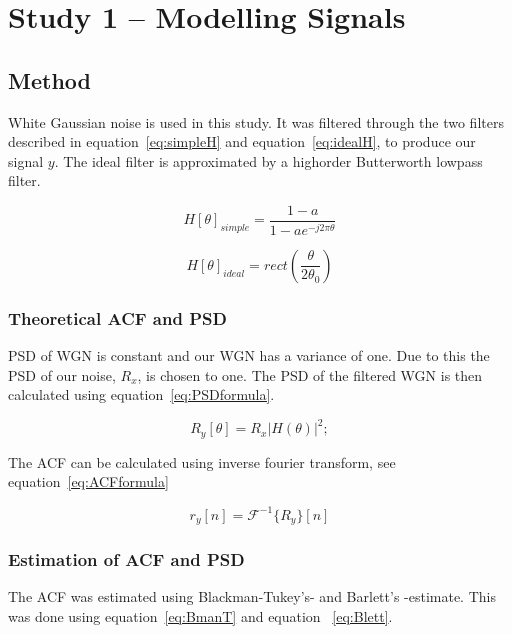 \documentclass[10pt]{article}
\begin{document}
\section{Study 1 – Modelling Signals}
\subsection{Method}

White Gaussian noise is used in this study. It was filtered through the two
 filters described in equation~\ref{eq:simpleH} and equation~\ref{eq:idealH},
  to produce our signal $y$.
 The ideal filter is approximated by a highorder Butterworth lowpass filter.

\begin{equation}
  \label{eq:simpleH}
  H[\theta]_{simple} =\frac{1-a}{1-ae^{-j2\pi\theta }}
\end{equation}

\begin{equation}
  \label{eq:idealH}
  H[\theta]_{ideal} =rect(\frac{\theta}{2\theta_0} )
\end{equation}

\subsubsection{Theoretical ACF and PSD}
PSD of WGN is constant and our WGN has a variance of one. Due to this the PSD
of our noise, $R_x$, is chosen to one.
The PSD of the filtered WGN is then calculated using equation~\ref{eq:PSDformula}.

\begin{equation}
  \label{eq:PSDformula}
  R_y[\theta] = R_x|H(\theta)|^2;
\end{equation}

The ACF can be calculated using inverse fourier transform, see equation~\ref{eq:ACFformula}

\begin{equation}
  \label{eq:ACFformula}
  r_y[n] = \mathcal{F}^{-1}\{R_y\}[n]
\end{equation}



\subsubsection{Estimation of ACF and PSD}
The ACF was estimated using Blackman-Tukey's- and Barlett's -estimate.
This was done using equation~\ref{eq:BmanT} and equation ~\ref{eq:Blett}.
\end{document}
